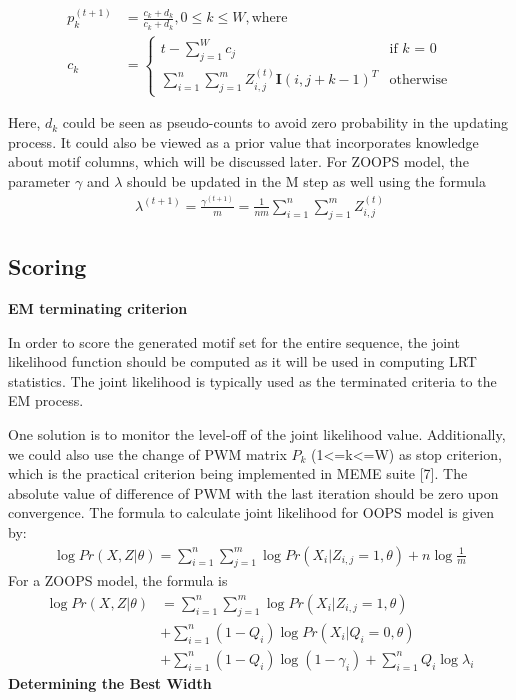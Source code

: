 \documentclass{article}
\begin{document}
\begin{align}\label{eqn}
p_k^{(t+1)}&=\frac{c_k+d_k}{c_k+d_k}, 0\leq k \leq W, \text{where} \\
 c_{k} &=    \begin{cases}
      t-\sum_{j=1}^{W}c_j & \text{if $k$ = 0}\\ 
      \sum_{i=1}^{n}\sum_{j=1}^{m}Z^{(t)}_{i,j}\textbf{I}(i,j+k-1)^T & \text{otherwise}
    \end{cases} 
\end{align}

Here, $d_k$ could be seen as pseudo-counts to avoid zero probability in the updating process. It could also be viewed as a prior value that incorporates knowledge about motif columns, which will be discussed later. For ZOOPS model, the parameter $\gamma$ and $\lambda$ should be updated in the M step as well using the formula
\begin{align}
\lambda^{(t+1)}=\frac{\gamma^{(t+1)}}{m}=\frac{1}{nm}\sum_{i=1}^{n}\sum_{j=1}^{m}Z^{(t)}_{i,j}
\end{align}

\subsection{Scoring}
\textbf{EM terminating criterion}

In order to score the generated motif set for the entire sequence, the joint likelihood function should be computed as it will be used in computing LRT statistics. The joint likelihood is typically used as the terminated criteria to the EM process. 

One solution is to monitor the level-off of the joint likelihood value. Additionally, we could also use the change of PWM matrix $P_k$ (1<=k<=W) as stop criterion, which is the practical criterion being implemented in MEME suite [7]. The absolute value of difference of PWM with the last iteration should be zero upon convergence.  The formula to calculate joint likelihood for OOPS model is given by:
\begin{align}
\log{Pr(X,Z|\theta)}=\sum_{i=1}^{n}\sum_{j=1}^{m}\log{Pr(X_i|Z_{i,j}=1,\theta)}+n\log{\frac{1}{m}}
\end{align}
For a ZOOPS model, the formula is
\begin{equation}
\begin{split}
\log{Pr(X,Z|\theta)}&=\sum_{i=1}^{n}\sum_{j=1}^{m}\log{Pr(X_i|Z_{i,j}=1,\theta)}\\&+\sum_{i=1}^{n}(1-Q_i)\log{Pr(X_i|Q_i=0,\theta)}\\
&+\sum_{i=1}^{n}(1-Q_i)\log{(1-\gamma_i)}+\sum_{i=1}^{n}Q_i\log{\lambda_i}
\end{split}
\end{equation}
\textbf{Determining the Best Width}
\end{document}
